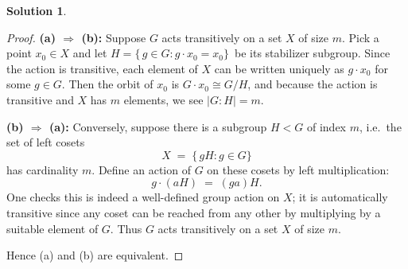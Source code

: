 \documentclass[12pt]{article}
\theoremstyle{definition} %
\newtheorem{solution}{Solution}
\theoremstyle{plain} %
\begin{document}
\begin{solution}
    \begin{proof}
        \textbf{(a) $\Longrightarrow$ (b):}  
        Suppose $G$ acts transitively on a set $X$ of size $m$. Pick a point $x_0 \in X$ and 
        let $H = \{\,g \in G : g\cdot x_0 = x_0\}\,$ be its stabilizer subgroup.  
        Since the action is transitive, each element of $X$ can be written uniquely as $g\cdot x_0$ for some $g\in G$. 
        Then the orbit of $x_0$ is $G\cdot x_0 \cong G/H$, 
        and because the action is transitive and $X$ has $m$ elements, 
        we see $\lvert G : H\rvert = m$.  
        
        \medskip
        
        \noindent
        \textbf{(b) $\Longrightarrow$ (a):}  
        Conversely, suppose there is a subgroup $H < G$ of index $m$, i.e.\ the set of left cosets 
        \[
        X \;=\; \{\,gH : g \in G\}
        \]
        has cardinality $m$.  Define an action of $G$ on these cosets by left multiplication:
        \[
        g \cdot (aH) \;=\; (ga)H.
        \]
        One checks this is indeed a well-defined group action on $X$; it is automatically transitive 
        since any coset can be reached from any other by multiplying by a suitable element of $G$.  
        Thus $G$ acts transitively on a set $X$ of size $m$.
        
        \medskip
        
        Hence (a) and (b) are equivalent. 
        \end{proof}
        
\end{solution}
\end{document}
